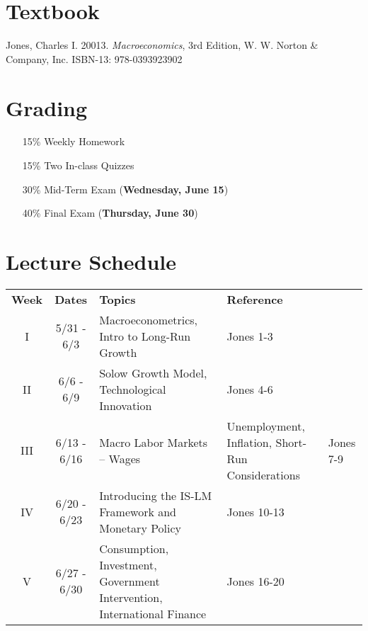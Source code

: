 \documentclass{article}
\begin{document}
\section*{Textbook}

Jones, Charles I. 20013. \textit{Macroeconomics}, 3rd Edition, W. W. Norton \& Company, Inc. ISBN-13: 978-0393923902

\section*{Grading}

\begin{itemize}
\item [15\%] Weekly Homework
\item [15\%] Two In-class Quizzes
\item [30\%] Mid-Term Exam (\textbf{Wednesday, June 15})
\item [40\%] Final Exam (\textbf{Thursday, June 30})
\end{itemize}

\section*{Lecture Schedule}

\begin{table}[h]
\centering
\begin{tabular}{c c p{7cm} l}
\textbf{Week} & \textbf{Dates} & \textbf{Topics} & \textbf{Reference} \\
I & 5/31 - 6/3 & Macroeconometrics, Intro to Long-Run Growth & Jones 1-3 \\
II & 6/6 - 6/9 & Solow Growth Model, Technological Innovation & Jones 4-6 \\
III & 6/13 - 6/16 & Macro Labor Markets -- Wages & Unemployment, Inflation, Short-Run Considerations & Jones 7-9 \\
IV & 6/20 - 6/23 & Introducing the IS-LM Framework and Monetary Policy & Jones 10-13 \\ 
V & 6/27 - 6/30 & Consumption, Investment, Government Intervention, International Finance & Jones 16-20 \\
\end{tabular}
\end{table}
\end{document}
